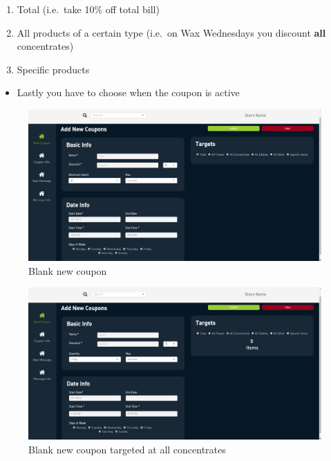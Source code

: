 \documentclass[]{book}
\providecommand{\tightlist}{%
  \setlength{\itemsep}{0pt}\setlength{\parskip}{0pt}}
\theoremstyle{definition}
\theoremstyle{definition}
\theoremstyle{definition}
\theoremstyle{remark}
\begin{document}
\begin{enumerate}
\def\labelenumi{\arabic{enumi}.}
\tightlist
\item
  Total (i.e.~take 10\% off total bill)
\item
  All products of a certain type (i.e.~on Wax Wednesdays you discount
  \textbf{all} concentrates)
\item
  Specific products
\end{enumerate}

\begin{itemize}
\tightlist
\item
  Lastly you have to choose when the coupon is active
\end{itemize}

\begin{figure}
\centering
\includegraphics{images/C1.png}
\caption{Blank new coupon}
\end{figure}

\begin{figure}
\centering
\includegraphics{images/C2.png}
\caption{Blank new coupon targeted at all concentrates}
\end{figure}
\end{document}
